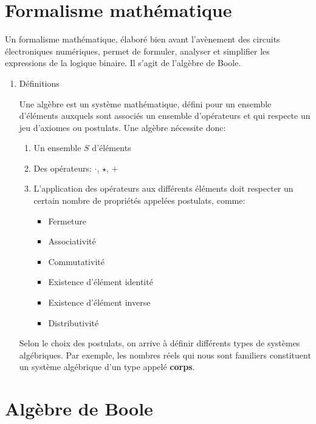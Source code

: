 \documentclass[letter, oneside]{book}
\begin{document}
\section{Formalisme mathématique}
\label{sec:orgcc2ac58}

Un formalisme mathématique, élaboré bien avant l'avènement des
circuits électroniques numériques, permet de formuler, analyser et
simplifier les expressions de la logique binaire. Il s'agit de
l'algèbre de Boole. 

\begin{enumerate}
\item Définitions
\label{sec:orgff029ca}

Une algèbre est un système mathématique, défini pour un ensemble
d'éléments auxquels sont associés un ensemble d'opérateurs et qui
respecte un jeu d'axiomes ou postulats. Une algèbre nécessite donc:

\begin{enumerate}
\item Un ensemble \(S\) d'éléments

\item Des opérateurs: \(\cdot\), \(\star\), \(+\)

\item L'application des opérateurs aux différents éléments doit respecter
un certain nombre de propriétés appelées postulats, comme:

\begin{itemize}
\item Fermeture

\item Associativité

\item Commutativité

\item Existence d'élément identité

\item Existence d'élément inverse

\item Distributivité
\end{itemize}
\end{enumerate}

Selon le choix des postulats, on arrive à définir différents types de
systèmes algébriques. Par exemple, les nombres réels qui nous sont
familiers constituent un système algébrique d'un type appelé \textbf{corps}.
\end{enumerate}

\section{Algèbre de Boole}
\label{sec:org9d8ca3d}
\end{document}
